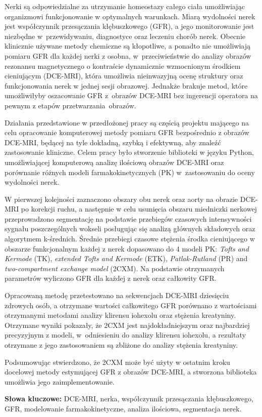 	
	\begin{spacing}{1.0}
	\begin{small}

Nerki są odpowiedzialne za utrzymanie homeostazy całego ciała umożliwiając organizmowi funkcjonowanie w optymalnych warunkach. Miarą wydolności nerek jest współczynnik przesączania kłębuszkowego (GFR), a jego monitorowanie jest niezbędne w~przewidywaniu, diagnostyce oraz leczeniu chorób nerek. Obecnie klinicznie używane metody chemiczne są kłopotliwe, a ponadto nie umożliwiają pomiaru GFR dla każdej nerki z osobna, w~przeciwieństwie do analizy obrazów rezonansu magnetycznego o kontraście dynamicznie wzmocnionym środkiem cieniującym (DCE-MRI), która umożliwia nieinwazyjną ocenę struktury oraz funkcjonowania  nerek w jednej sesji obrazowej. Jednakże brakuje metod, które umożliwiłyby oszacowanie GFR z~obrazów DCE-MRI bez ingerencji operatora na pewnym z etapów przetwarzania~obrazów.

Działania przedstawione w przedłożonej pracy są częścią projektu mającego na celu opracowanie komputerowej metody pomiaru GFR bezpośrednio z obrazów DCE-MRI, będącej na tyle dokładną, szybką i efektywną, aby znaleźć zastosowanie kliniczne. Celem pracy było stworzenie biblioteki w języku Python, umożliwiającej komputerową analizę ilościową obrazów DCE-MRI oraz porównanie różnych modeli farmakokinetycznych (PK) w~zastosowaniu do oceny wydolności nerek.

W pierwszej kolejności zaznaczono obszary obu nerek oraz aorty na obrazie DCE-MRI po korekcji ruchu, a następnie w celu usunięcia obszaru miedniczki nerkowej przeprowadzono segmentację na podstawie przebiegów czasowych intensywności sygnału poszczególnych wokseli posługując się analizą głównych składowych oraz algorytmem k-średnich. Średnie przebiegi czasowe stężenia środka cieniującego w obszarze funkcjonalnym każdej z nerek dopasowano do 4 modeli PK: \textit{Tofts and Kermode} (TK), \textit{extended Tofts and Kermode} (ETK), \textit{Patlak-Rutland} (PR) and \textit{two-compartment exchange model} (2CXM). Na podstawie otrzymanych parametrów wyliczono GFR dla każdej z nerek oraz całkowity GFR.

Opracowaną metodę przetestowano na sekwencjach DCE-MRI dziesięciu zdro\-wych osób, a otrzymane wartości całkowitego GFR porównano z wartościami otrzymanymi metodami analizy klirensu iohexolu oraz stężenia kreatyniny. 
Otrzymane wyniki pokazały, że 2CXM jest najdokładniejszym oraz najbardziej precyzyjnym z modeli, w~odniesieniu do analizy klirensu iohexolu, a rezultaty otrzymane z jego zastosowaniem są zbliżone do analizy stężenia kreatyniny.

Podsumowując stwierdzono, że 2CXM może być użyty w ostatnim kroku docelowej metody estymującej GFR z obrazów DCE-MRI, a stworzona biblioteka umożliwia jego zaimplementowanie. 
 

	\end{small}
	
	\vfill
		\normalsize \noindent \textbf{Słowa kluczowe:} DCE-MRI, nerka, współczynnik przesączania kłębuszkowego, GFR, modelowanie farmakokinetyczne, analiza ilościowa, segmentacja nerek.  
		
			\end{spacing}
		\newpage
		\restoregeometry
\thispagestyle{empty}
\mbox{}

	\newpage	
